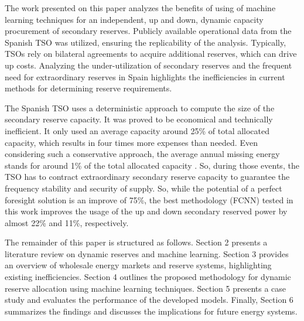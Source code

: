 The work presented on this paper analyzes the benefits of using of machine learning techniques for an independent, up and down, dynamic capacity procurement of secondary reserves. Publicly available operational data from the Spanish \gls{TSO} was utilized, ensuring the replicability of the analysis. Typically, \gls{TSO}s rely on bilateral agreements to acquire additional reserves, which can drive up costs. Analyzing the under-utilization of secondary reserves and the frequent need for extraordinary reserves in Spain highlights the inefficiencies in current methods for determining reserve requirements. 

{The Spanish TSO uses a deterministic approach to compute the size of the secondary reserve capacity. It was proved to be economical and technically inefficient. It only used an average capacity around 25\% of total allocated capacity, which results in four times more expenses than needed. Even considering such a conservative approach, the average annual missing energy stands for around 1\% of the total allocated capacity \cite{Frade:19c,Algarvio2024,Algarvio:24,Martin:18}. So, during those events, the TSO has to contract extraordinary secondary reserve capacity to guarantee the frequency stability and security of supply. So, while the potential of a perfect foresight solution is an improve of 75\%, the best methodology (\gls{FCNN}) tested in this work improves the usage of the up and down secondary reserved power by almost 22\% and 11\%, respectively}. 
\par

The remainder of this paper is structured as follows. Section 2 presents a literature review on dynamic reserves and machine learning. Section 3 provides an overview of wholesale energy markets and reserve systems, highlighting existing inefficiencies. Section 4 outlines the proposed methodology for dynamic reserve allocation using machine learning techniques. Section 5 presents a case study and evaluates the performance of the developed models. Finally, Section 6 summarizes the findings and discusses the implications for future energy systems.\par

